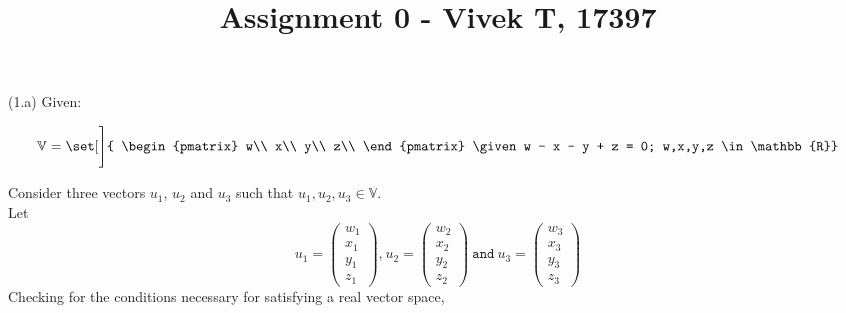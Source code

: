 \documentclass[12pt,letterpaper,fleqn]{article}
\title{Assignment 0 - Vivek T, 17397}
\theoremstyle{definition}
\begin{document}
(1.a) Given:

\begin{equation}
\mathbb{V} = 
\set[\Bigg]{
\begin{pmatrix}
w\\
x\\
y\\
z\\
\end{pmatrix}
\given w - x - y + z = 0; w,x,y,z \in \mathbb{R}}
\end{equation}

Consider three vectors $u_1$, $u_2$ and $u_3$ such that $u_1, u_2, u_3 \in \mathbb{V}$.\\
Let 
\begin{equation*}
u_1 =
\begin{pmatrix}
w_1\\
x_1\\
y_1\\
z_1
\end{pmatrix}\texttt{,}~
u_2 = 
\begin{pmatrix}
w_2\\
x_2\\
y_2\\
z_2
\end{pmatrix}~\texttt{and}~
u_3 = 
\begin{pmatrix}
w_3\\
x_3\\
y_3\\
z_3
\end{pmatrix}
\end{equation*}
Checking for the conditions necessary for satisfying a real vector space,
\end{document}

